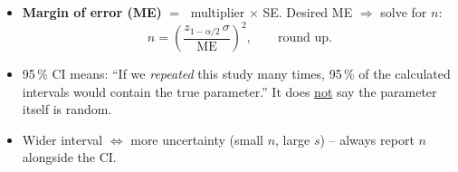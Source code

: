 \documentclass[12pt]{book}
\begin{document}
\begin{itemize}
\item \textbf{Margin of error (ME)} $=\;$ multiplier $\times$ SE.  
      Desired ME $\Rightarrow$ solve for $n$:
      \[
        n=\left(\frac{z_{1-\alpha/2}\,\sigma}{\text{ME}}\right)^{2},
        \qquad\text{round up}.
      \]

\item 95\,\% CI means: “If we \emph{repeated} this study many times,
      95\,\% of the calculated intervals would contain the true parameter.”
      It does \underline{not} say the parameter itself is random.

\item Wider interval $\Leftrightarrow$ more uncertainty  
      (small $n$, large $s$) – always report $n$ alongside the CI.

\end{itemize}


\newpage
\pagestyle{fancy}
\end{document}
